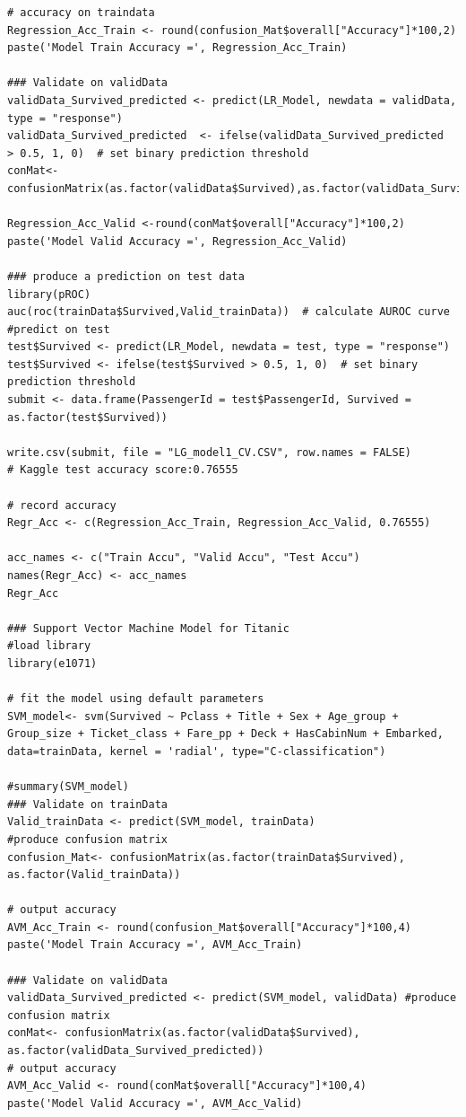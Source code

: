 \documentclass[
]{book}
\begin{document}
\begin{verbatim}
# accuracy on traindata
Regression_Acc_Train <- round(confusion_Mat$overall["Accuracy"]*100,2)
paste('Model Train Accuracy =', Regression_Acc_Train)

### Validate on validData
validData_Survived_predicted <- predict(LR_Model, newdata = validData, type = "response")
validData_Survived_predicted  <- ifelse(validData_Survived_predicted  > 0.5, 1, 0)  # set binary prediction threshold
conMat<- confusionMatrix(as.factor(validData$Survived),as.factor(validData_Survived_predicted))

Regression_Acc_Valid <-round(conMat$overall["Accuracy"]*100,2)
paste('Model Valid Accuracy =', Regression_Acc_Valid)

### produce a prediction on test data
library(pROC)
auc(roc(trainData$Survived,Valid_trainData))  # calculate AUROC curve
#predict on test
test$Survived <- predict(LR_Model, newdata = test, type = "response")
test$Survived <- ifelse(test$Survived > 0.5, 1, 0)  # set binary prediction threshold
submit <- data.frame(PassengerId = test$PassengerId, Survived = as.factor(test$Survived))

write.csv(submit, file = "LG_model1_CV.CSV", row.names = FALSE)
# Kaggle test accuracy score:0.76555

# record accuracy
Regr_Acc <- c(Regression_Acc_Train, Regression_Acc_Valid, 0.76555)

acc_names <- c("Train Accu", "Valid Accu", "Test Accu")
names(Regr_Acc) <- acc_names
Regr_Acc

### Support Vector Machine Model for Titanic
#load library
library(e1071)

# fit the model using default parameters
SVM_model<- svm(Survived ~ Pclass + Title + Sex + Age_group + Group_size + Ticket_class + Fare_pp + Deck + HasCabinNum + Embarked, data=trainData, kernel = 'radial', type="C-classification")

#summary(SVM_model)
### Validate on trainData
Valid_trainData <- predict(SVM_model, trainData)
#produce confusion matrix
confusion_Mat<- confusionMatrix(as.factor(trainData$Survived), as.factor(Valid_trainData))

# output accuracy
AVM_Acc_Train <- round(confusion_Mat$overall["Accuracy"]*100,4)
paste('Model Train Accuracy =', AVM_Acc_Train)

### Validate on validData
validData_Survived_predicted <- predict(SVM_model, validData) #produce confusion matrix
conMat<- confusionMatrix(as.factor(validData$Survived), as.factor(validData_Survived_predicted))
# output accuracy
AVM_Acc_Valid <- round(conMat$overall["Accuracy"]*100,4)
paste('Model Valid Accuracy =', AVM_Acc_Valid)


\end{verbatim}
\end{document}
